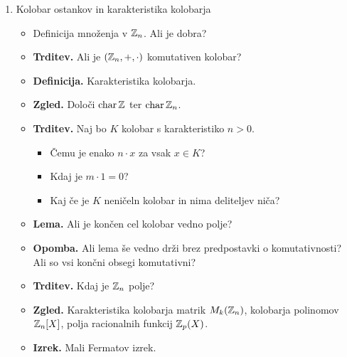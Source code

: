 \begin{enumerate}
    \item Kolobar ostankov in karakteristika kolobarja
    \begin{itemize}
        \item Definicija množenja v \(\mathbb{Z}_n\). Ali je dobra?
        \item \textbf{Trditev.} Ali je $(\mathbb{Z}_n, +, \cdot)$ komutativen kolobar?
        \item \textbf{Definicija.} Karakteristika kolobarja.
        \item \textbf{Zgled.} Določi \(\operatorname{char} \mathbb{Z}\) ter \(\operatorname{char} \mathbb{Z}_n\).
        \item \textbf{Trditev.} Naj bo \(K\) kolobar s karakteristiko \(n > 0\).
        \begin{itemize}
            \item Čemu je enako \(n \cdot x\) za vsak \(x \in K\)?
            \item Kdaj je \(m \cdot 1 = 0\)?
            \item Kaj če je \(K\) neničeln kolobar in nima deliteljev niča?
        \end{itemize}
        \item \textbf{Lema.} Ali je končen cel kolobar vedno polje?
        \item \textbf{Opomba.} Ali lema še vedno drži brez predpostavki o komutativnosti? Ali so vsi končni obsegi komutativni?
        \item \textbf{Trditev.} Kdaj je \(\mathbb{Z}_n\) polje?
        \item \textbf{Zgled.} Karakteristika kolobarja matrik \(M_k(\mathbb{Z}_n)\), kolobarja polinomov \(\mathbb{Z}_n[X]\), polja racionalnih funkcij \(\mathbb{Z}_p(X)\).
        \item \textbf{Izrek.} Mali Fermatov izrek.
    \end{itemize}


\end{enumerate}
